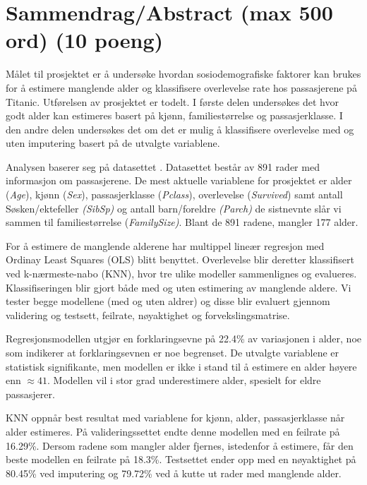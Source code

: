 \section{Sammendrag/Abstract (max 500 ord) (10 poeng)}\label{sammendragabstract-max-500-ord-10-poeng}

Målet til prosjektet er å undersøke hvordan sosiodemografiske faktorer kan brukes for å estimere manglende alder og klassifisere overlevelse rate hos passasjerene på Titanic. Utførelsen av prosjektet er todelt. I første delen undersøkes det hvor godt alder kan estimeres basert på kjønn, familiestørrelse og passasjerklasse. I den andre delen undersøkes det om det er mulig å klassifisere overlevelse med og uten imputering basert på de utvalgte variablene.

Analysen baserer seg på datasettet \parencite[]{titanic_dataset}. Datasettet består av 891 rader med informasjon om passasjerene. De mest aktuelle variablene for prosjektet er alder (\textit{Age}), kjønn (\textit{Sex}), passasjerklasse (\textit{Pclass}), overlevelse (\textit{Survived}) samt antall Søsken/ektefeller \textit{(SibSp)} og antall barn/foreldre \textit{(Parch)} de sistnevnte slår vi sammen til familiestørrelse (\textit{FamilySize)}. Blant de 891 radene, mangler 177 alder.

For å estimere de manglende alderene har multippel lineær regresjon med Ordinay Least Squares (OLS) blitt benyttet. Overlevelse blir deretter klassifisert ved k-nærmeste-nabo (KNN), hvor tre ulike modeller sammenlignes og evalueres. Klassifiseringen blir gjort både med og uten estimering av manglende aldere. Vi tester begge modellene (med og uten aldrer) og disse blir evaluert gjennom validering og testsett, feilrate, nøyaktighet og forvekslingsmatrise.

Regresjonsmodellen utgjør en forklaringsevne på 22.4\% av variasjonen i alder, noe som indikerer at forklaringsevnen er noe begrenset. De utvalgte variablene er statistisk signifikante, men modellen er ikke i stand til å estimere en alder høyere enn $\approx 41$. Modellen vil i stor grad underestimere alder, spesielt for eldre passasjerer.

KNN oppnår best resultat med variablene for kjønn, alder, passasjerklasse når alder estimeres. På valideringssettet endte denne modellen med en feilrate på 16.29\%. Dersom radene som mangler alder fjernes, istedenfor å estimere, får den beste modellen en feilrate på 18.3\%. Testsettet ender opp med en nøyaktighet på 80.45\% ved imputering og 79.72\% ved å kutte ut rader med manglende alder.

